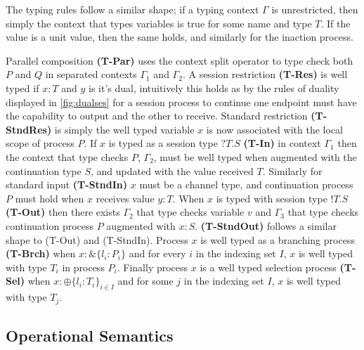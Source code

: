 The typing rules follow a similar shape; if a typing context $\Gamma$ is unrestricted, then simply the context that types variables is true for some name and type $T$. If the value is a unit value, then the same holds, and similarly for the inaction process. 

Parallel composition \textbf{(T-Par)} uses the context split operator to type check both $P$ and $Q$ in separated contexts $\Gamma_1$ and $\Gamma_2$. A session restriction \textbf{(T-Res)} is well typed if $x : T$ and $y$ is it's dual, intuitively this holds as by the rules of duality displayed in \autoref{fig:dualses} for a session process to continue one endpoint must have the capability to output and the other to receive. Standard restriction \textbf{(T-StndRes)} is simply the well typed variable $x$ is now associated with the local scope of process $P$. If $x$ is typed as a session type $?T.S$ \textbf{(T-In)} in context $\Gamma_1$ then the context that type checks $P$, $\Gamma_2$, must be well typed when augmented with the continuation type $S$, and updated with the value received $T$. Similarly for standard input \textbf{(T-StndIn)} $x$ must be a channel type, and continuation process $P$ must hold when $x$ receives value $y:T$. When $x$ is typed with session type $!T.S$ \textbf{(T-Out)} then there exists $\Gamma_2$ that type checks variable $v$ and $\Gamma_3$ that type checks continuation process $P$ augmented with $x : S$. \textbf{(T-StndOut)} follows a similar shape to (T-Out) and (T-StndIn). Process $x$ is well typed as a branching process \textbf{(T-Brch)} when $x : \&\{ l_i : P_i \}$ and for every $i$ in the indexing set $I$, $x$ is well typed with type $T_i$ in process $P_i$. Finally process $x$ is a well typed selection process \textbf{(T-Sel)} when $x : \oplus \{ l_i : T_i \}_{i \in I}$ and for some $j$ in the indexing set $I$, $x$ is well typed with type $T_j$.



  \subsection{Operational Semantics}

